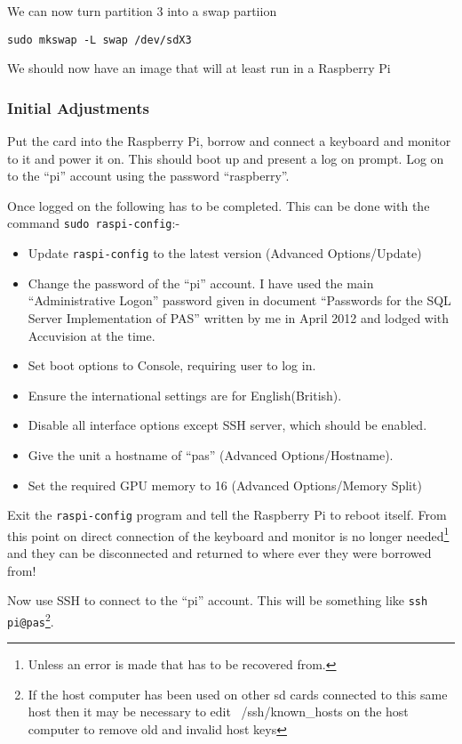 \documentclass[Draft]{akc}
\begin{document}
We can now turn partition 3 into a swap partiion
\begin{lstlisting}
sudo mkswap -L swap /dev/sdX3
\end{lstlisting}

We should now have an image that will at least run in a Raspberry Pi

\subsubsection{Initial Adjustments}

Put the card into the Raspberry Pi, borrow and connect a keyboard and monitor to it and power it on.  This
should boot up and present a log on prompt. Log on to the ``pi'' account using the password ``raspberry''.

Once logged on the following has to be completed. This can be done with the command \texttt{sudo
raspi-config}:-

\begin{itemize}
\item Update \texttt{raspi-config} to the latest version (Advanced Options/Update)
\item Change the password of the ``pi'' account. I have used the main
``Administrative Logon'' password given in document ``Passwords for the SQL Server Implementation of
PAS'' written by me in April 2012 and lodged with Accuvision at the time.
\item Set boot options to Console, requiring user to log in.
\item Ensure the international settings are for English(British).
\item Disable all interface options except SSH server, which should be enabled.
\item Give the unit a hostname of ``pas'' (Advanced Options/Hostname).
\item Set the required GPU memory to 16  (Advanced Options/Memory Split)
\end{itemize}

Exit the \texttt{raspi-config} program and tell the Raspberry Pi to reboot itself.  From this point
on direct connection of the keyboard and monitor is no longer needed\footnote{Unless an error is
made that has to be recovered from.} and they can be disconnected and returned to where ever they
were borrowed from!

Now use SSH to connect to the ``pi'' account.  This will be something like \texttt{ssh pi@pas}\footnote{If
the host computer has been used on other sd cards connected to this same host then it may be necessary to
edit ~/ssh/known\_hosts on the host computer to remove old and invalid host keys}.
\end{document}
